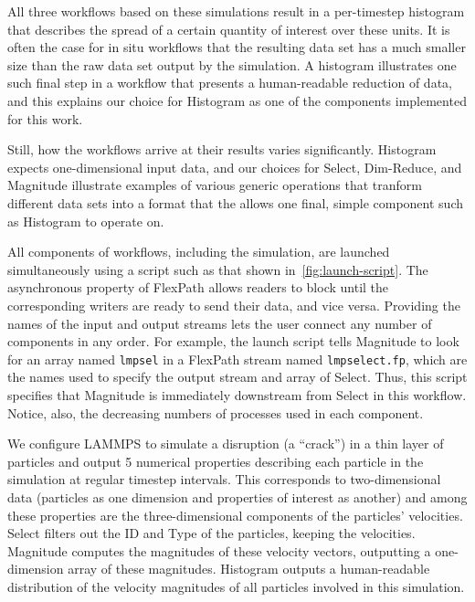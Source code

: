 
All three \sys workflows based on these simulations result in a
per-timestep histogram that describes
the spread of a certain quantity of interest over these
units.  It is often the case for in situ workflows
that the resulting data set has a much smaller size than
the raw data set output by the simulation. A histogram
illustrates one such final step in a workflow
that presents a human-readable
reduction of data, and this explains our choice for
Histogram as one of the \sys components implemented for this work.

Still, how the workflows arrive at their results varies significantly.
Histogram expects one-dimensional input data, and
our choices for Select, Dim-Reduce, and Magnitude
illustrate examples of various generic operations that tranform
different data sets into a format that the allows
one final, simple component such as Histogram to operate on.

All components of \sys workflows, including the simulation,
are launched simultaneously using a script such as
that shown in~\autoref{fig:launch-script}.
The asynchronous property of FlexPath
allows readers to block until the corresponding
writers are ready to send their data, and vice versa.
Providing the names of the input and output streams
lets the user connect any number of components
in any order.
For example, the launch script tells Magnitude
to look for an array named \texttt{lmpsel}
in a FlexPath stream named \texttt{lmpselect.fp},
which are the names used to specify the output
stream and array of Select.
Thus, this script specifies that Magnitude is
immediately downstream from Select in this workflow.
Notice, also, the decreasing numbers of processes
used in each component.

We configure LAMMPS to simulate a disruption (a ``crack'') in a thin layer of
particles and output 5 numerical properties describing each particle in the
simulation at regular timestep intervals. This corresponds to two-dimensional
data (particles as one dimension and properties of interest as another) and
among these properties are the three-dimensional components of the particles'
velocities.
Select filters out the ID and Type of the particles, keeping
the velocities. Magnitude computes the magnitudes
of these velocity vectors, outputting a one-dimension array
of these magnitudes. Histogram outputs a human-readable distribution
of the velocity magnitudes of all particles involved in this simulation.

